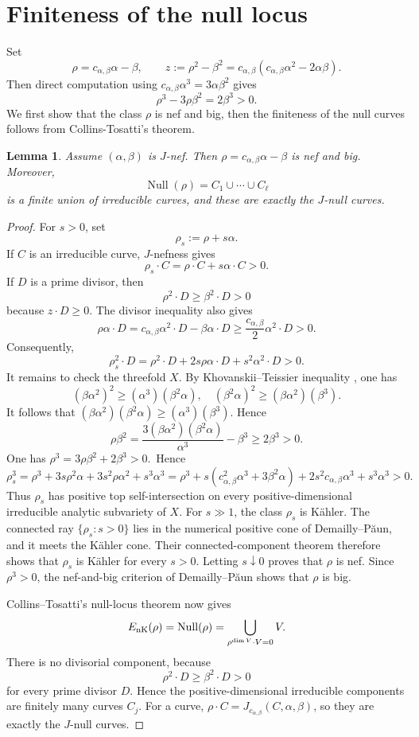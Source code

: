 \documentclass[reqno]{amsart}
\theoremstyle{remark}
\newcommand{\cab}{c_{\alpha,\beta}}
\theoremstyle{plain}
\newtheorem{lemma}[thm]{Lemma}
\begin{document}
\section{Finiteness of the null locus}
Set \[
\rho=c_{\alpha,\beta}\alpha-\beta, \qquad z:=\rho^2-\beta^2=\cab(\cab\alpha^2-2\alpha\beta).\] Then direct computation using $\cab\alpha^3=3\alpha\beta^2$ gives  
 \[\rho^3-3\rho\beta^2=2\beta^3>0.\]
We first show that the class $\rho$ is nef and big, then the finiteness of the null curves follows from Collins-Tosatti's theorem.
\begin{lemma}\label{lem:rho-nef}
Assume $(\alpha,\beta)$ is $J$-nef.  Then $\rho=\cab\alpha-\beta$ is nef and
big.  Moreover,
\[
 \operatorname{Null}(\rho)
 =C_1\cup\cdots\cup C_\ell
\]
is a finite union of irreducible curves, and these are exactly the
$J$-null curves.
    
\end{lemma}
\begin{proof}
For $s>0$, set
\[
 \rho_s:=\rho+s\alpha.
\]
If $C$ is an irreducible curve,  $J$-nefness gives
\[
 \rho_s\cdot C=\rho\cdot C+s\alpha\cdot C>0.
\]
If $D$ is a prime divisor, then
\[
 \rho^2\cdot D\geq\beta^2\cdot D>0
\]
because $z\cdot D\geq0$.  The divisor inequality also gives
\[
 \rho\alpha\cdot D
 =c_{\alpha,\beta}\alpha^2\cdot D-\beta\alpha\cdot D
 \geq\frac{c_{\alpha,\beta}}{2}\alpha^2\cdot D>0.
\]
Consequently,
\[
 \rho_s^2\cdot D
 =\rho^2\cdot D+2s\rho\alpha\cdot D+s^2\alpha^2\cdot D>0.
\]
It remains to check the threefold $X$. By Khovanskii--Teissier inequality \cite[proposition 2.1]{DP03}, one has \[
(\beta\alpha^2)^2\geq(\alpha^3)(\beta^2\alpha), \quad (\beta^2\alpha)^2\geq (\beta\alpha^2)(\beta^3).
\]
It follows that $(\beta\alpha^2)(\beta^2\alpha)\geq (\alpha^3)(\beta^3).$ Hence \[
\rho\beta^2=\frac{3(\beta\alpha^2)(\beta^2\alpha)}{\alpha^3}-\beta^3\geq 2\beta^3>0.
\]
One has $\rho^3=3\rho\beta^2+2\beta^3>0$.\
Hence \[
\rho_s^3=\rho^3+3s\rho^2\alpha+3s^2\rho\alpha^2+s^3\alpha^3=\rho^3+s(\cab^2\alpha^3+3\beta^2\alpha)+2s^2\cab\alpha^3+s^3\alpha^3>0.
\]
Thus $\rho_s$ has positive top self-intersection on every positive-dimensional irreducible analytic subvariety of $X$. For
$s\gg1$, the class $\rho_s$ is K\"ahler.  The connected ray
$\{\rho_s:s>0\}$ lies in the numerical positive cone of
Demailly--P\u{a}un, and it meets the K\"ahler cone.  Their
connected-component theorem therefore shows that $\rho_s$ is
K\"ahler for every $s>0$\cite{DP04}.  Letting $s\downarrow0$ proves that
$\rho$ is nef.  Since $\rho^3>0$, the nef-and-big criterion of
Demailly--P\u{a}un shows that $\rho$ is big. 

Collins--Tosatti's null-locus theorem now gives
\[
 E_{\rm nK}(\rho)
 =\operatorname{Null}(\rho)
 =\bigcup_{\rho^{\dim V}\cdot V=0}V.
\]
There is no divisorial component, because
\[
 \rho^2\cdot D\geq\beta^2\cdot D>0
\]
for every prime divisor $D$.  Hence the positive-dimensional
irreducible components are finitely many curves $C_j$.  For a curve,
$\rho\cdot C=J_{\cab}(C,\alpha,\beta)$, so they are exactly the
$J$-null curves.

\end{proof}
\end{document}
